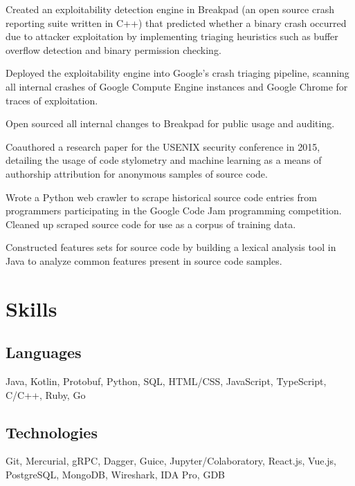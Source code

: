 \documentclass[]{template}
\begin{document}
\sectionsep

\hfill
{}
\begin{tightemize}
\item
  Created an exploitability detection engine in Breakpad (an open source crash
  reporting suite written in C++) that predicted whether a binary
  crash occurred due to attacker exploitation by implementing triaging heuristics
  such as buffer overflow detection and binary permission checking.
\item
  Deployed the exploitability engine into Google's crash triaging pipeline,
  scanning all internal crashes of Google Compute Engine instances and Google
  Chrome for traces of exploitation.
\item
  Open sourced all internal changes to Breakpad for public usage and auditing.
\end{tightemize}

\sectionsep

\hfill
{}
\begin{tightemize}
\item
  Coauthored a research paper for the USENIX security conference in 2015,
  detailing the usage of code stylometry and machine learning as a means of
  authorship attribution for anonymous samples of source code.
\item
  Wrote a Python web crawler to scrape historical source code entries from
  programmers participating in the Google Code Jam programming competition.
  Cleaned up scraped source code for use as a corpus of training data.
\item
  Constructed features sets for source code by building a lexical analysis tool
  in Java to analyze common features present in source code samples.
\end{tightemize}

\section{Skills}

\subsection{Languages}
Java,
Kotlin,
Protobuf,
Python,
SQL,
HTML/CSS,
JavaScript,
TypeScript,
C/C++,
Ruby,
Go

\sectionsep

\subsection{Technologies}
Git,
Mercurial,
gRPC,
Dagger,
Guice,
Jupyter/Colaboratory,
React.js,
Vue.js,
PostgreSQL,
MongoDB,
Wireshark,
IDA Pro,
GDB

\lastupdated
\end{document}
